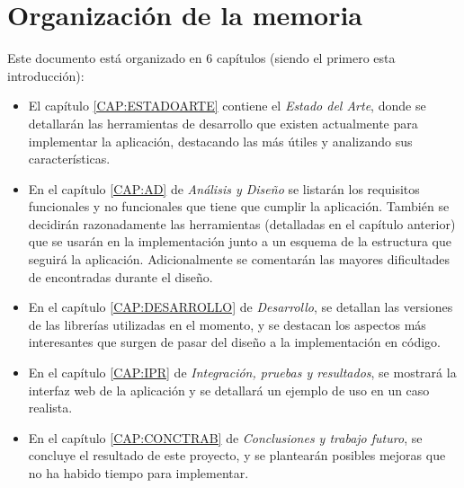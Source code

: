   
  \section{Organización de la memoria\label{SEC:ORGANIZACION}}
    Este documento está organizado en 6 capítulos (siendo el primero esta introducción): 
    \begin{itemize}
      \item El capítulo \ref{CAP:ESTADOARTE} contiene el \textit{Estado del Arte}, donde se detallarán las herramientas de desarrollo que existen actualmente para implementar la aplicación, destacando las más útiles y analizando sus características.
      
      \item En el capítulo \ref{CAP:AD} de \textit{Análisis y Diseño} se listarán los requisitos funcionales y no funcionales que tiene que cumplir la aplicación. También se decidirán razonadamente las herramientas (detalladas en el capítulo anterior) que se usarán en la implementación junto a un esquema de la estructura que seguirá la aplicación. Adicionalmente se comentarán las mayores dificultades de encontradas durante el diseño.
      
      \item En el capítulo \ref{CAP:DESARROLLO} de \textit{Desarrollo}, se detallan las versiones de las librerías utilizadas en el momento, y se destacan los aspectos más interesantes que surgen de pasar del diseño a la implementación en código.
      
      \item En el capítulo \ref{CAP:IPR} de \textit{Integración, pruebas y resultados}, se mostrará la interfaz web de la aplicación y se detallará un ejemplo de uso en un caso realista.
      
      \item En el capítulo \ref{CAP:CONCTRAB} de \textit{Conclusiones y trabajo futuro}, se concluye el resultado de este proyecto, y se plantearán posibles mejoras que no ha habido tiempo para implementar.
    \end{itemize}
    
    
